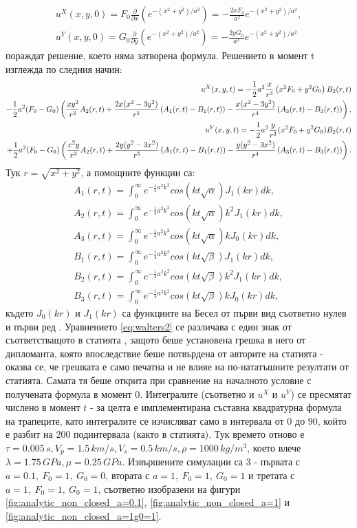 \documentclass{report}
\begin{document}
	\begin{align}
		u^X(x,y,0) = F_0\frac{\partial}{\partial x}(e^{-(x^2+y^2)/a^2})=-\frac{2xF_0}{a^2}e^{-(x^2+y^2)/a^2},\\
		u^Y(x,y,0) = G_0\frac{\partial}{\partial y}(e^{-(x^2+y^2)/a^2})=-\frac{2yG_0}{a^2}e^{-(x^2+y^2)/a^2}
	\end{align}
	пораждат решение, което няма затворена формула. Решението в момент t изглежда по следния начин:
	\begin{align}
		u^X(x,y,t)=-\frac{1}{2}a^2\frac{x}{r^3}\left(x^2F_0+y^2G_0\right)B_2(r,t)\notag{}\\
		-\frac{1}{2}a^2(F_0-G_0)\left(\frac{xy^2}{r^3}A_2(r,t)
		+\frac{2x(x^2-3y^2)}{r^5}\left(A_1(r,t)-B_1(r,t)\right)
		-\frac{x(x^2-3y^2)}{r^4}\left(A_3(r,t) - B_3(r,t)\right)\right),\label{eq:walters1}\\
		u^Y(x,y,t)=-\frac{1}{2}a^2\frac{y}{r^3}(x^2F_0+y^2G_0)B_2(r,t)\\
		+\frac{1}{2}a^2(F_0-G_0)\left(\frac{x^2y}{r^3}A_2(r,t)+\frac{2y(y^2-3x^2)}{r^5}\left(A_1(r,t)-B_1(r,t)\right)
		-\frac{y(y^2-3x^2)}{r^4}\left(A_3(r,t)-B_3(r,t)\right)\right).\label{eq:walters2}
	\end{align}
	Тук $r=\sqrt{x^2+y^2}$, а помощните функции са:
	\begin{align}
		A_1(r,t)=\int_0^\infty e^{-\frac{1}{4}a^2k^2}cos(kt\sqrt{\alpha})J_1(kr)dk,\\
		A_2(r,t)=\int_0^\infty e^{-\frac{1}{4}a^2k^2}cos(kt\sqrt{\alpha})k^2J_1(kr)dk,\\
		A_3(r,t)=\int_0^\infty e^{-\frac{1}{4}a^2k^2}cos(kt\sqrt{\alpha})kJ_0(kr)dk,\\
		B_1(r,t)=\int_0^\infty e^{-\frac{1}{4}a^2k^2}cos(kt\sqrt{\beta})J_1(kr)dk,\\
		B_2(r,t)=\int_0^\infty e^{-\frac{1}{4}a^2k^2}cos(kt\sqrt{\beta})k^2J_1(kr)dk,\\
		B_3(r,t)=\int_0^\infty e^{-\frac{1}{4}a^2k^2}cos(kt\sqrt{\beta})kJ_0(kr)dk,
	\end{align}
	където $J_0(kr)$ и $J_1(kr)$ са функциите на Бесел от първи вид съответно нулев и първи ред \cite{abramowitz1964handbook}. Уравнението \ref{eq:walters2} се различава с един знак от съответстващото в статията \cite{walters2020analytic}, защото беше установена грешка в него от дипломанта, която впоследствие беше потвърдена от авторите на статията - оказва се, че грешката е само печатна и не влияе на по-нататъшните резултати от статията. Самата тя беше открита при сравнение на началното условие с получената формула в момент 0. Интегралите (съответно и $u^X$ и $u^Y$) се пресмятат числено в момент $t$ - за целта е имплементирана съставна квадратурна формула на трапеците, като интегралите се изчисляват само в интервала от $0$ до $90$, който е разбит на $200$ подинтервала (както в статията). Тук времето отново е $\tau=0.005\,s, V_p=1.5\,km/s, V_s=0.5\, km/s, \rho=1000\,kg/m^3$, което влече $\lambda=1.75\,GPa, \mu=0.25\,GPa$. Извършените симулации са $3$ - първата с $a=0.1,~F_0=1,~G_0=0$, втората с $a=1,~F_0=1,~G_0=1$ и третата с $a=1,~F_0=1,~G_0=1$, съответно изобразени на фигури \ref{fig:analytic_non_closed_a=0.1}, \ref{fig:analytic_non_closed_a=1} и \ref{fig:analytic_non_closed_a=1g0=1}.\\
\end{document}

